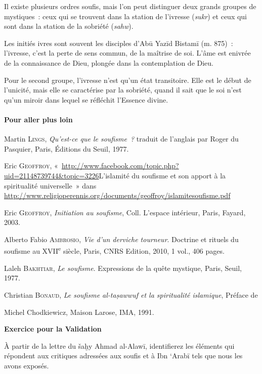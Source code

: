 Il existe plusieurs ordres soufis, mais l'on peut distinguer deux grands
groupes de mystiques~: ceux qui se trouvent dans la station de l'ivresse
(\emph{sukr}) et ceux qui sont dans la station de la sobriété
(\emph{sahw}).

Les initiés ivres sont souvent les disciples d'Abū Yazīd Bistamī (m.
875)~: l'ivresse, c'est la perte de sens commun, de la maîtrise de soi.
L'âme est enivrée de la connaissance de Dieu, plongée dans la
contemplation de Dieu.

Pour le second groupe, l'ivresse n'est qu'un état transitoire. Elle est
le début de l'unicité, mais elle se caractérise par la sobriété, quand
il sait que le soi n'est qu'un miroir dans lequel se réfléchit l'Essence
divine.

\paragraph{Pour aller plus loin}

Martin \textsc{Lings}, \emph{Qu'est-ce que le soufisme~?} traduit de
l'anglais par Roger du Pasquier, Paris, Éditions du Seuil, 1977.

Eric \textsc{Geoffroy},
«~\url{http://www.facebook.com/topic.php?uid=21148739744\&topic=3226}{L'islamité
du soufisme et son apport à la spiritualité universelle}~» dans
\url{http://www.religioperennis.org/documents/geoffroy/islamitesoufisme.pdf}

Eric \textsc{Geoffroy}, \emph{Initiation au soufisme}, Coll. L'espace
intérieur, Paris, Fayard, 2003.

Alberto Fabio \textsc{Ambrosio}, \emph{Vie d'un derviche tourneur}.
Doctrine et rituels du soufisme au XVII\textsuperscript{e} siècle,
Paris, CNRS Edition, 2010, 1 vol., 406 pages.

Laleh \textsc{Bakhtiar}, \emph{Le soufisme}. Expressions de la quête
mystique, Paris, Seuil, 1977.

Christian \textsc{Bonaud}, \emph{Le soufisme al-taṣawwuf et la
spiritualité islamique}, Préface de

Michel Chodkiewicz, Maison Larose, IMA, 1991.

\textbf{Exercice pour la Validation}

À partir de la lettre du šaḫy Ahmad al-Alawī, identifierez les éléments
qui répondent aux critiques adressées aux soufis et à Ibn `Arabī tels
que nous les avons exposés.


